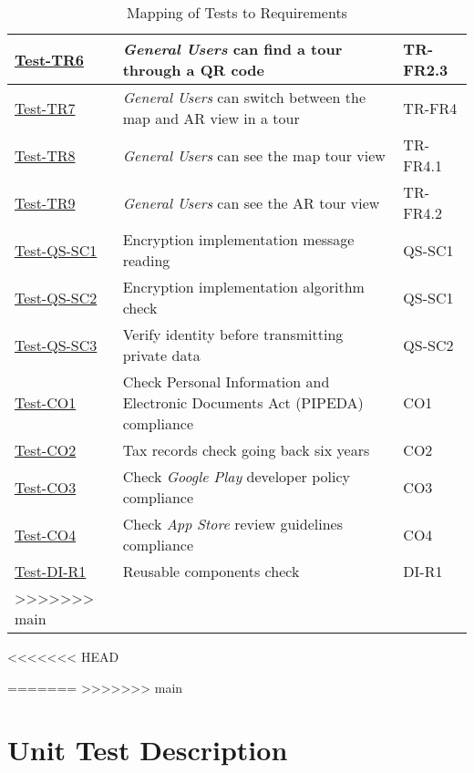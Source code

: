 \documentclass[12pt, titlepage]{article}
\begin{document}
\begin{enumerate}
\begin{table}[h!]
\begin{tabular}{|l|l|l|}
        \hyperref[itm:Test-TR6]{Test-TR6} & \textit{General Users} can find a tour through a QR code & TR-FR2.3 \\
        \hline
        \hyperref[itm:Test-TR7]{Test-TR7} & \textit{General Users} can switch between the map and AR view in a tour & TR-FR4 \\
        \hline
        \hyperref[itm:Test-TR8]{Test-TR8} & \textit{General Users} can see the map tour view \label{itm:Test-TR8} & TR-FR4.1 \\
        \hline
        \hyperref[itm:Test-TR9]{Test-TR9} & \textit{General Users} can see the AR tour view & TR-FR4.2 \\
        \hline
        \hyperref[itm:Test-QS-SC1]{Test-QS-SC1} & Encryption implementation message reading & QS-SC1 \\
        \hline
        \hyperref[itm:Test-QS-SC2]{Test-QS-SC2} & Encryption implementation algorithm check & QS-SC1 \\
        \hline
        \hyperref[itm:Test-QS-SC3]{Test-QS-SC3} & Verify identity before transmitting private data & QS-SC2 \\
        \hline
        \hyperref[itm:Test-CO1]{Test-CO1} & Check Personal Information and Electronic
Documents Act (PIPEDA) \cite{PIPEDA} compliance & CO1 \\
        \hline
        \hyperref[itm:Test-CO2]{Test-CO2} & Tax records check going back six years & CO2 \\
        \hline
        \hyperref[itm:Test-CO3]{Test-CO3} & Check \textit{Google Play} developer policy \cite{GooglePlay} compliance & CO3 \\
        \hline
        \hyperref[itm:Test-CO4]{Test-CO4} & Check \textit{App Store} review guidelines \cite{AppStore} compliance & CO4 \\
        \hline
        \hyperref[itm:Test-DI-R1]{Test-DI-R1} & Reusable components check & DI-R1 \\
>>>>>>> main
        \hline
    \end{tabular}
    \caption{Mapping of Tests to Requirements}
    \label{tab:test_requirements}
\end{table}

\pagebreak
<<<<<<< HEAD
  
=======
>>>>>>> main

\section{Unit Test Description}


\end{enumerate}
\end{document}
